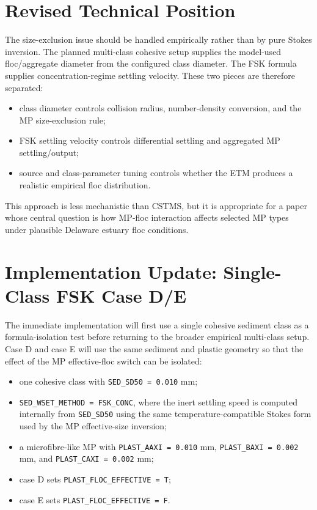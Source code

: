 \documentclass[11pt]{article}
\begin{document}
\section*{Revised Technical Position}

The size-exclusion issue should be handled empirically rather than by pure
Stokes inversion.  The planned multi-class cohesive setup supplies the
model-used floc/aggregate diameter from the configured class diameter.  The FSK
formula supplies concentration-regime settling velocity.  These two pieces are
therefore separated:
\begin{itemize}
  \item class diameter controls collision radius, number-density conversion,
        and the MP size-exclusion rule;
  \item FSK settling velocity controls differential settling and aggregated MP
        settling/output;
  \item source and class-parameter tuning controls whether the ETM produces a
        realistic empirical floc distribution.
\end{itemize}

This approach is less mechanistic than CSTMS, but it is appropriate for a paper
whose central question is how MP-floc interaction affects selected MP types
under plausible Delaware estuary floc conditions.

\section*{Implementation Update: Single-Class FSK Case D/E}

The immediate implementation will first use a single cohesive sediment class as
a formula-isolation test before returning to the broader empirical multi-class
setup.  Case D and case E will use the same sediment and plastic geometry so
that the effect of the MP effective-floc switch can be isolated:
\begin{itemize}
  \item one cohesive class with \texttt{SED\_SD50 = 0.010} mm;
  \item \texttt{SED\_WSET\_METHOD = FSK\_CONC}, where the inert settling speed
        is computed internally from \texttt{SED\_SD50} using the same
        temperature-compatible Stokes form used by the MP effective-size
        inversion;
  \item a microfibre-like MP with \texttt{PLAST\_AAXI = 0.010} mm,
        \texttt{PLAST\_BAXI = 0.002} mm, and
        \texttt{PLAST\_CAXI = 0.002} mm;
  \item case D sets \texttt{PLAST\_FLOC\_EFFECTIVE = T};
  \item case E sets \texttt{PLAST\_FLOC\_EFFECTIVE = F}.
\end{itemize}
\end{document}
